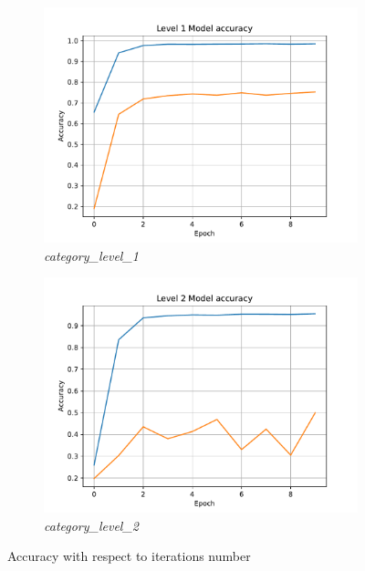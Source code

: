 \begin{figure}[htpb]
	\centering
	\begin{subfigure}{0.48\linewidth}
		\centering
		\includegraphics[width=\linewidth]{Images/level_1_epoch_accuracy.pdf}
		\caption{\textit{category\_level\_1}}
	\end{subfigure}
	\begin{subfigure}{0.48\linewidth}
		\centering
		\includegraphics[width=\linewidth]{Images/level_2_epoch_accuracy.pdf}
		\caption{\textit{category\_level\_2}}
	\end{subfigure}
	\caption{Accuracy with respect to iterations number}
	\label{fig:epocs_vs_accuracy}
\end{figure}

